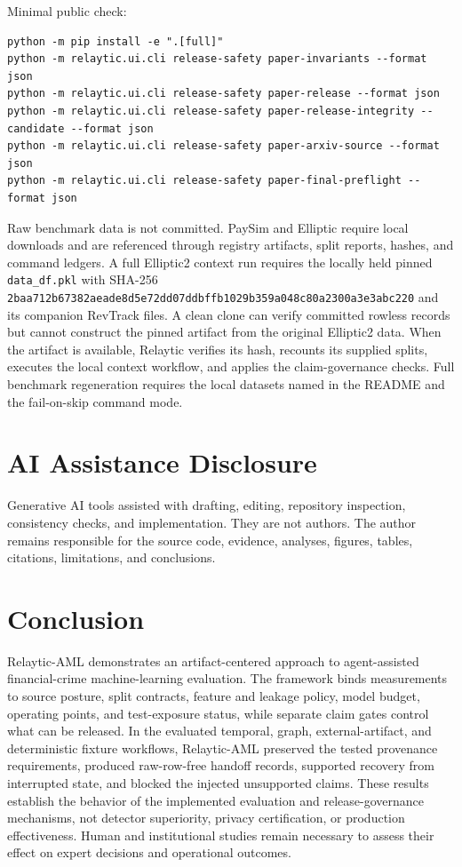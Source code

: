 \documentclass[11pt]{article}
\begin{document}
Minimal public check:

\begin{Verbatim}[frame=single,framesep=6pt,fontsize=\footnotesize,breaklines=true,breakanywhere=true]
python -m pip install -e ".[full]"
python -m relaytic.ui.cli release-safety paper-invariants --format json
python -m relaytic.ui.cli release-safety paper-release --format json
python -m relaytic.ui.cli release-safety paper-release-integrity --candidate --format json
python -m relaytic.ui.cli release-safety paper-arxiv-source --format json
python -m relaytic.ui.cli release-safety paper-final-preflight --format json
\end{Verbatim}


Raw benchmark data is not committed. PaySim and Elliptic require local downloads and are referenced through registry artifacts, split reports, hashes, and command ledgers. A full \mbox{Elliptic2} context run requires the locally held pinned \nolinkurl{data_df.pkl} with SHA-256 \nolinkurl{2baa712b67382aeade8d5e72dd07ddbffb1029b359a048c80a2300a3e3abc220} and its companion RevTrack files. A clean clone can verify committed rowless records but cannot construct the pinned artifact from the original \mbox{Elliptic2} data. When the artifact is available, Relaytic verifies its hash, recounts its supplied splits, executes the local context workflow, and applies the claim-governance checks. Full benchmark regeneration requires the local datasets named in the README and the fail-on-skip command mode.

\section{AI Assistance Disclosure}

Generative AI tools assisted with drafting, editing, repository inspection, consistency checks, and implementation. They are not authors. The author remains responsible for the source code, evidence, analyses, figures, tables, citations, limitations, and conclusions.

\section{Conclusion}

Relaytic-AML demonstrates an artifact-centered approach to agent-assisted financial-crime machine-learning evaluation. The framework binds measurements to source posture, split contracts, feature and leakage policy, model budget, operating points, and test-exposure status, while separate claim gates control what can be released. In the evaluated temporal, graph, external-artifact, and deterministic fixture workflows, Relaytic-AML preserved the tested provenance requirements, produced raw-row-free handoff records, supported recovery from interrupted state, and blocked the injected unsupported claims. These results establish the behavior of the implemented evaluation and release-governance mechanisms, not detector superiority, privacy certification, or production effectiveness. Human and institutional studies remain necessary to assess their effect on expert decisions and operational outcomes.
\end{document}
